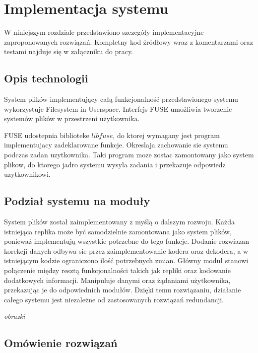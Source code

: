 \chapter{Implementacja systemu}
\thispagestyle{chapterBeginStyle}
W niniejszym rozdziale przedstawiono szczegóły implementacyjne zaproponowanych rozwiązań. Kompletny kod źródłowy wraz z komentarzami oraz testami najduje się w załączniku do pracy.

\section{Opis technologii}

System plików implementujący całą funkcjonalność przedstawionego systemu wykorzystuje Filesystem in Userspace. Interfejs FUSE umożliwia tworzenie systemów plików w przestrzeni użytkownika. 

FUSE udostepnia biblioteke $libfuse$, do ktorej wymagany jest program implementujacy zadeklarowane funkcje. Okreslaja zachowanie sie systemu podczas zadan uzytkownika. Taki program moze zostac zamontowany jako system plikow, do ktorego jadro systemu wysyla zadania i przekazuje odpowiedz uzytkownikowi.

\section{Podział systemu na moduły}
System plików został zaimplementowany z myślą o dalszym rozwoju. Każda istniejąca replika może być samodzielnie zamontowana jako system plików, ponieważ implementują wszystkie potrzebne do tego funkcje. Dodanie rozwiazan korekcji danych odbywa sie przez zaimplementowanie kodera oraz dekodera, a w istniejącym kodzie ograniczono ilość potrzebnych zmian. Główny moduł stanowi połączenie między resztą funkcjonalności takich jak repliki oraz kodowanie dodatkowych informacji. Manipuluje danymi oraz żądaniami użytkownika, przekazując je do odpowiednich modułów. Dzięki temu rozwiązaniu, działanie całego systemu jest niezależne od zastosowanych rozwiązań redundancji.

\textit{obrazki}

\section{Omówienie rozwiązań}

